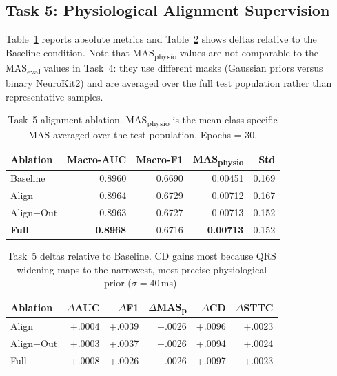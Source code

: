 \documentclass{article}
\begin{document}
\subsection{Task 5: Physiological Alignment Supervision}

Table~\ref{tab:alignment} reports absolute metrics and
Table~\ref{tab:alignment_delta} shows deltas relative to the
Baseline condition. Note that MAS\textsubscript{physio} values are
not comparable to the MAS\textsubscript{eval} values in Task~4:
they use different masks (Gaussian priors versus binary NeuroKit2)
and are averaged over the full test population rather than
representative samples.

\begin{table}[h!]
\caption{Task~5 alignment ablation. MAS\textsubscript{physio} is the
mean class-specific MAS averaged over the test population. Epochs = 30.}
\label{tab:alignment}
\vskip 0.1in
\begin{center}
\begin{scriptsize}
\begin{tabular}{lrrrr}
\toprule
Ablation & Macro-AUC & Macro-F1 & MAS\textsubscript{physio} & Std \\
\midrule
Baseline   & 0.8960 & 0.6690 & 0.00451 & 0.169 \\
Align      & 0.8964 & 0.6729 & 0.00712 & 0.167 \\
Align$+$Out & 0.8963 & 0.6727 & 0.00713 & 0.152 \\
\textbf{Full} & \textbf{0.8968} & 0.6716 & \textbf{0.00713} & 0.152 \\
\bottomrule
\end{tabular}
\end{scriptsize}
\end{center}
\end{table}

\begin{table}[ht]
\caption{Task~5 deltas relative to Baseline. CD gains most
because QRS widening maps to the narrowest, most precise physiological
prior ($\sigma{=}40$\,ms).}
\label{tab:alignment_delta}
\vskip 0.1in
\begin{center}
\begin{scriptsize}
\begin{tabular}{lrrrrr}
\toprule
Ablation & $\Delta$AUC & $\Delta$F1 & $\Delta$MAS\textsubscript{p} & $\Delta$CD & $\Delta$STTC \\
\midrule
Align      & +.0004 & +.0039 & +.0026 & +.0096 & +.0023 \\
Align$+$Out & +.0003 & +.0037 & +.0026 & +.0094 & +.0024 \\
Full       & +.0008 & +.0026 & +.0026 & +.0097 & +.0023 \\
\bottomrule
\end{tabular}
\end{scriptsize}
\end{center}
\end{table}
\end{document}
